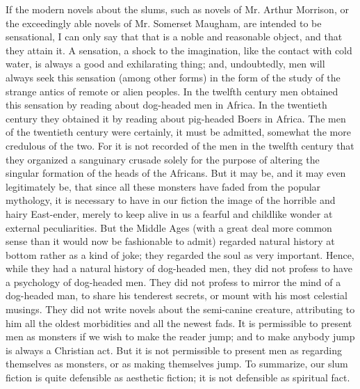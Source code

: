 If the modern novels about the slums, such as novels of Mr. Arthur Morrison, or the exceedingly able novels of Mr. Somerset Maugham, are intended to be sensational, I can only say that that is a noble and reasonable object, and that they attain it. A sensation, a shock to the imagination, like the contact with cold water, is always a good and exhilarating thing; and, undoubtedly, men will always seek this sensation (among other forms) in the form of the study of the strange antics of remote or alien peoples. In the twelfth century men obtained this sensation by reading about dog-headed men in Africa. In the twentieth century they obtained it by reading about pig-headed Boers in Africa. The men of the twentieth century were certainly, it must be admitted, somewhat the more credulous of the two. For it is not recorded of the men in the twelfth century that they organized a sanguinary crusade solely for the purpose of altering the singular formation of the heads of the Africans. But it may be, and it may even legitimately be, that since all these monsters have faded from the popular mythology, it is necessary to have in our fiction the image of the horrible and hairy East-ender, merely to keep alive in us a fearful and childlike wonder at external peculiarities. But the Middle Ages (with a great deal more common sense than it would now be fashionable to admit) regarded natural history at bottom rather as a kind of joke; they regarded the soul as very important. Hence, while they had a natural history of dog-headed men, they did not profess to have a psychology of dog-headed men. They did not profess to mirror the mind of a dog-headed man, to share his tenderest secrets, or mount with his most celestial musings. They did not write novels about the semi-canine creature, attributing to him all the oldest morbidities and all the newest fads. It is permissible to present men as monsters if we wish to make the reader jump; and to make anybody jump is always a Christian act. But it is not permissible to present men as regarding themselves as monsters, or as making themselves jump. To summarize, our slum fiction is quite defensible as aesthetic fiction; it is not defensible as spiritual fact.

